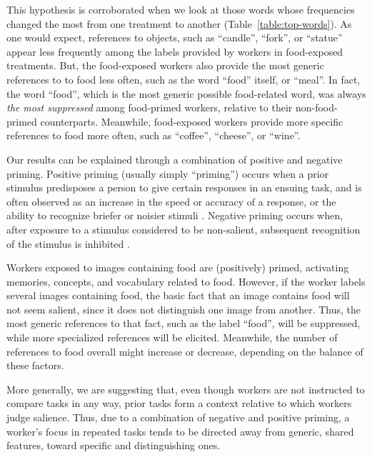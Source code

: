 \documentclass{pnastwo}
\begin{document}
\begin{article}
This hypothesis is corroborated when we look at those words whose frequencies
changed the most from one treatment to another (Table~\ref{table:top-words}).
As one would expect, references to objects, such as ``candle'', ``fork'', 
or ``statue'' appear less frequently among the labels provided by workers in 
food-exposed treatments.  But, the food-exposed workers also provide the most
generic references to to food less often, such as the word ``food'' itself, 
or ``meal''.  
In fact, the word ``food'', which is the most generic possible food-related 
word, was always \textit{the most suppressed} among food-primed workers, 
relative to their non-food-primed counterparts.  
Meanwhile, food-exposed workers provide more specific references to food more 
often, such as ``coffee'', ``cheese'', or ``wine''.


Our results can be explained through a combination of positive and negative
priming.  Positive priming (usually simply ``priming'') occurs when a prior
stimulus predisposes a person to give certain responses in an ensuing task, and
is often observed as an increase in the speed or accuracy of a response, or the
ability to recognize briefer or noisier stimuli
\cite{BJOP1796,BJOP1826,Huber2008324}.  Negative priming occurs when, after
exposure to a stimulus considered to be non-salient, subsequent recognition of
the stimulus is inhibited \cite{mayr2007negative}.

Workers exposed to images containing food are (positively) primed, activating
memories, concepts, and vocabulary related to food.  However, if the worker
labels several images containing food, the basic fact that an image contains
food will not seem salient, since it does not distinguish one image from
another.  Thus, the most generic references to that fact, such as the label
``food'', will be suppressed, while more specialized references will be
elicited.  Meanwhile, the number of references to food overall might increase
or decrease, depending on the balance of these factors.  

More generally, we are suggesting that, even though workers are not instructed
to compare tasks in any way, prior tasks form a context relative to which
workers judge salience.  Thus, due to a combination of negative and positive
priming, a worker's focus in repeated tasks tends to be directed away from
generic, shared features, toward specific and distinguishing ones.


\end{article}
\end{document}
